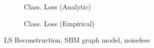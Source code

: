 \begin{figure}[h]
\begin{subfigure}[T]{0.5\columnwidth}
    \caption{Class. Loss (Analytic)}
    \label{subsubfig:SBM_noiseless_sgc_LS_class_anal}
    \end{subfigure}%
    \begin{subfigure}[T]{0.5\columnwidth}
    \caption{Class. Loss (Empirical)}%
    \label{subsubfig:SBM_noiseless_sgc_LS_class_emp}
    \end{subfigure}%
    \caption{LS Reconstruction, SBM graph model, noiseless}
    \vspace{-0.19cm}
\label{subfig:SBM_noiseless_sgc_LS}
\end{figure}


\iffalse


